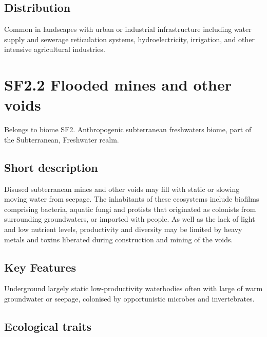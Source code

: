 \documentclass[
  letterpaper,
  DIV=11,
  numbers=noendperiod]{scrartcl}
\begin{document}
\subsection{Distribution}\label{distribution-64}

Common in landscapes with urban or industrial infrastructure including
water supply and sewerage reticulation systems, hydroelectricity,
irrigation, and other intensive agricultural industries.

\section{SF2.2 Flooded mines and other
voids}\label{sf2.2-flooded-mines-and-other-voids}

Belongs to biome SF2. Anthropogenic subterranean freshwaters biome, part
of the Subterranean, Freshwater realm.

\subsection{Short description}\label{short-description-65}

Disused subterranean mines and other voids may fill with static or
slowing moving water from seepage. The inhabitants of these ecosystems
include biofilms comprising bacteria, aquatic fungi and protists that
originated as colonists from surrounding groundwaters, or imported with
people. As well as the lack of light and low nutrient levels,
productivity and diversity may be limited by heavy metals and toxins
liberated during construction and mining of the voids.

\subsection{Key Features}\label{key-features-65}

Underground largely static low-productivity waterbodies often with large
of warm groundwater or seepage, colonised by opportunistic microbes and
invertebrates.

\subsection{Ecological traits}\label{ecological-traits-65}
\end{document}
